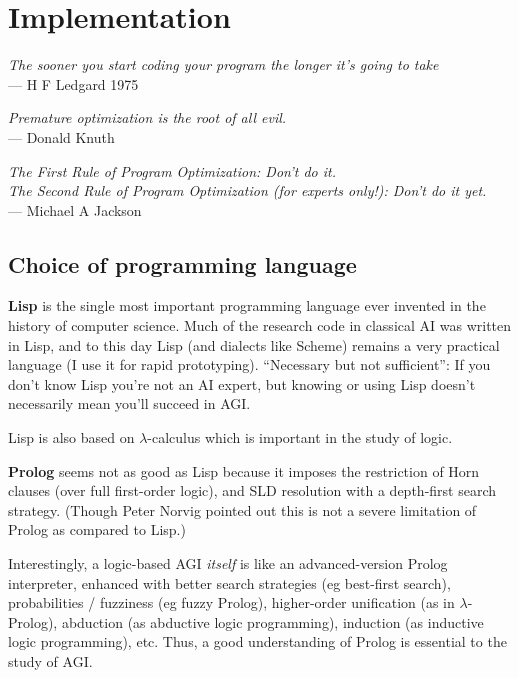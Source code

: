 \chapter{Implementation}

\begin{flushright}
\emph{The sooner you start coding your program the longer it's going to take}\\
--- H F Ledgard 1975
\end{flushright}

\begin{flushright}
\emph{Premature optimization is the root of all evil.}\\
--- Donald Knuth
\end{flushright}

\begin{flushright}
\emph{The First Rule of Program Optimization: Don't do it.\\
The Second Rule of Program Optimization (for experts only!): Don't do it yet.}\\
--- Michael A Jackson
\end{flushright}

\minitoc

\section{Choice of programming language}

\textbf{Lisp} is the single most important programming language ever invented in the history of computer science.  Much of the research code in classical AI was written in Lisp, and to this day Lisp (and dialects like Scheme) remains a very practical language (I use it for rapid prototyping).  ``Necessary but not sufficient'':  If you don't know Lisp you're not an AI expert, but knowing or using Lisp doesn't necessarily mean you'll succeed in AGI.

Lisp is also based on $\lambda$-calculus which is important in the study of logic.

\textbf{Prolog} seems not as good as Lisp because it imposes the restriction of Horn clauses (over full first-order logic), and SLD resolution with a depth-first search strategy.  (Though Peter Norvig pointed out this is not a severe limitation of Prolog as compared to Lisp.)

Interestingly, a logic-based AGI \textit{itself} is like an advanced-version Prolog interpreter, enhanced with better search strategies (eg best-first search), probabilities / fuzziness (eg fuzzy Prolog), higher-order unification (as in $\lambda$-Prolog), abduction (as abductive logic programming), induction (as inductive logic programming), etc.  Thus, a good understanding of Prolog is essential to the study of AGI.

